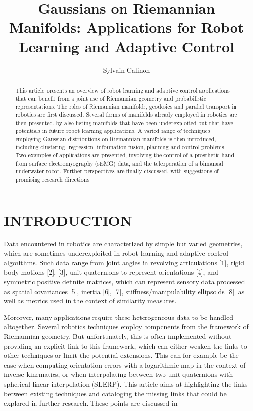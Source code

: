 \documentclass[10pt]{article}
\title{Gaussians on Riemannian Manifolds: Applications for Robot Learning and Adaptive Control }
\author{Sylvain Calinon}
\date{}
\begin{document}
\maketitle


\begin{abstract}
This article presents an overview of robot learning and adaptive control applications that can benefit from a joint use of Riemannian geometry and probabilistic representations. The roles of Riemannian manifolds, geodesics and parallel transport in robotics are first discussed. Several forms of manifolds already employed in robotics are then presented, by also listing manifolds that have been underexploited but that have potentials in future robot learning applications. A varied range of techniques employing Gaussian distributions on Riemannian manifolds is then introduced, including clustering, regression, information fusion, planning and control problems. Two examples of applications are presented, involving the control of a prosthetic hand from surface electromyography (sEMG) data, and the teleoperation of a bimanual underwater robot. Further perspectives are finally discussed, with suggestions of promising research directions.
\end{abstract}

\section{INTRODUCTION}
Data encountered in robotics are characterized by simple but varied geometries, which are sometimes underexploited in robot learning and adaptive control algorithms. Such data range from joint angles in revolving articulations [1], rigid body motions [2], [3], unit quaternions to represent orientations [4], and symmetric positive definite matrices, which can represent sensory data processed as spatial covariances [5], inertia [6], [7], stiffness/manipulability ellipsoids [8], as well as metrics used in the context of similarity measures.

Moreover, many applications require these heterogeneous data to be handled altogether. Several robotics techniques employ components from the framework of Riemannian geometry. But unfortunately, this is often implemented without providing an explicit link to this framework, which can either weaken the links to other techniques or limit the potential extensions. This can for example be the case when computing orientation errors with a logarithmic map in the context of inverse kinematics, or when interpolating between two unit quaternions with spherical linear interpolation (SLERP). This article aims at highlighting the links between existing techniques and cataloging the missing links that could be explored in further research. These points are discussed in
\end{document}
